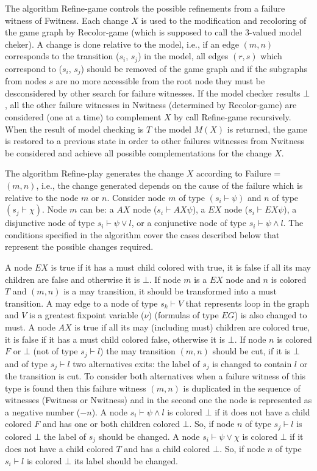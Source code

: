 \documentclass{llncs}
\begin{document}
The algorithm Refine-game controls the possible refinements from a failure witness of Fwitness. Each change $X$ is used to the modification and recoloring of the game graph by Recolor-game (which is supposed to call the 3-valued model cheker). A change is done relative to the model, i.e., if an edge $(m,n)$ corresponds to the transition ($s_{i}$, $s_{j}$) in the model, all edges $(r, s)$ which correspond to ($s_{i}$, $s_{j}$) should be removed of the game graph and if the subgraphs from nodes $s$ are no more accessible from the root node they must be desconsidered by other search for failure witnesses. If the model checker results $\bot$, all the other failure witnesses in Nwitness (determined by Recolor-game) are considered (one at a time) to complement $X$ by call Refine-game recursively. When the result of model checking is $T$ the model $M(X)$ is returned, the game is restored to a previous state in order to other failures witnesses from Nwitness be considered and achieve all possible complementations for the change $X$. 
 
The algorithm Refine-play generates the change $X$ according to Failure = $(m,n)$, i.e., the change generated depends on the cause of the failure which is relative to the node $m$ or $n$. Consider node $m$ of type $(s_{i} \vdash \psi)$ and $n$ of type $(s_{j} \vdash \chi)$. Node $m$ can be: a $AX$ node ($s_{i} \vdash AX\psi$), a $EX$ node ($s_{i} \vdash EX\psi$), a disjunctive node of type $s_{i} \vdash \psi \vee l$, or a conjunctive node of type $s_{i} \vdash \psi \wedge l$. The conditions specified in the algorithm cover the cases described below that represent the possible changes required.  

A node $EX$ is true if it has a must child colored with true, it is false if all its may children are false and otherwise it is $\bot$. If node $m$ is a $EX$ node and $n$ is colored $T$ and $(m,n)$ is a may transition, it should be transformed into a must transition. A may edge to a node of type $s_{k} \vdash V$ that represents loop in the graph and $V$ is a greatest fixpoint variable ($\nu$) (formulas of type $EG$) is also changed to must. A node $AX$ is true if all its may (including must) children are colored true, it is false if it has a must child colored false, otherwise it is $\bot$. If node $n$ is colored $F$ or $\bot$ (not of type $s_{j} \vdash l$) the may transition $(m,n)$ should be cut, if it is $\bot$ and of type $s_{j} \vdash l$  two alternatives exits: the label of $s_{j}$ is changed to contain $l$ or the transition is cut. To consider both alternatives when a failure witness of this type is found then this failure witness $(m,n)$ is duplicated in the sequence of witnesses (Fwitness or Nwitness) and in the second one the node is represented as a negative number ($-n$). A node $s_{i} \vdash \psi \wedge l$ is colored $\bot$ if it does not have a child colored $F$ and has one or both children colored $\bot$. So, if node $n$ of type $s_{j} \vdash l$ is colored $\bot$ the label of $s_{j}$ should be changed. A node $s_{i} \vdash \psi \vee \chi$ is colored $\bot$ if it does not have a child colored $T$ and has a child colored $\bot$. So, if node $n$ of type $s_{i} \vdash l$ is colored $\bot$ its label should be changed.
\end{document}
